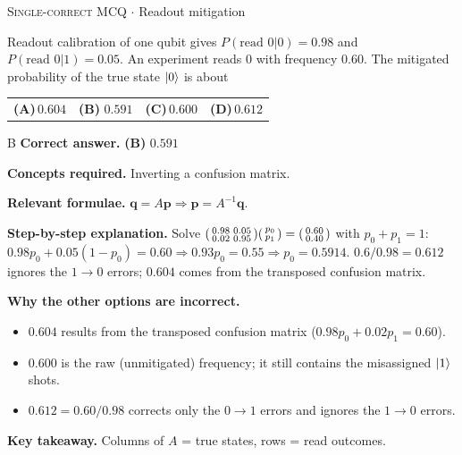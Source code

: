 \documentclass[11pt,a4paper]{article}
\newcommand{\optlabel}[1]{\textbf{(#1)}}
\newcommand{\correctlabel}[1]{\textcolor{okgreen}{\textbf{(#1)}\,\ding{51}}}
\newenvironment{qitem}[1]{\begin{list}{}{\setlength{\leftmargin}{3.3em}\setlength{\labelwidth}{3.1em}%
  \setlength{\labelsep}{0.2em}\setlength{\topsep}{3pt}\setlength{\parsep}{3pt}}\item[\textbf{Q.#1}\hfill]}{\end{list}}
\newcommand{\qsep}{\par\vspace{2pt}{\color{black!15}\hrule}\vspace{4pt}}
\newcommand{\qmeta}[2]{{\footnotesize\color{black!60}\textsc{#1} \;$\cdot$\; #2}\par}
\begin{document}
\begin{qitem}{66}
\qmeta{Single-correct MCQ}{Readout mitigation}
Readout calibration of one qubit gives $P(\text{read }0|0) = 0.98$ and $P(\text{read }0|1) = 0.05$. An experiment reads $0$ with frequency $0.60$. The mitigated
probability of the true state $\ket0$ is about
\par\smallskip\noindent\begin{tabularx}{\linewidth}{@{}*{4}{L}@{}}
\optlabel{A}\,$0.604$ & \correctlabel{B}\,$0.591$ & \optlabel{C}\,$0.600$ & \optlabel{D}\,$0.612$
\end{tabularx}
\end{qitem}
\begin{solbox}{B}
\textbf{\color{brand}Correct answer.} \textcolor{okgreen}{\textbf{(B)}} $0.591$

\textbf{\color{brand}Concepts required.} Inverting a confusion matrix.

\textbf{\color{brand}Relevant formulae.} $\mathbf q = A\mathbf p \Rightarrow \mathbf p = A^{-1}\mathbf q$.

\textbf{\color{brand}Step-by-step explanation.} Solve $\begin{psmallmatrix}0.98 & 0.05\\ 0.02 & 0.95\end{psmallmatrix}\begin{psmallmatrix}p_0\\ p_1\end{psmallmatrix} = \begin{psmallmatrix}0.60\\ 0.40\end{psmallmatrix}$ with
$p_0 + p_1 = 1$: $0.98p_0 + 0.05(1 - p_0) = 0.60 \Rightarrow 0.93p_0 = 0.55 \Rightarrow p_0 = 0.5914$. $0.6/0.98 = 0.612$ ignores the $1\to0$ errors;
$0.604$ comes from the transposed confusion matrix.

\textbf{\color{brand}Why the other options are incorrect.}
\begin{itemize}[leftmargin=2.4em, itemsep=1pt, topsep=2pt]
\item[\textbf{(A)}] $0.604$ results from the transposed confusion matrix ($0.98p_0 + 0.02p_1 = 0.60$).
\item[\textbf{(C)}] $0.600$ is the raw (unmitigated) frequency; it still contains the misassigned $\ket1$ shots.
\item[\textbf{(D)}] $0.612 = 0.60/0.98$ corrects only the $0 \to 1$ errors and ignores the $1 \to 0$ errors.
\end{itemize}
\textbf{\color{brand}Key takeaway.} Columns of $A$ = true states, rows = read outcomes.
\end{solbox}
\qsep
\end{document}
